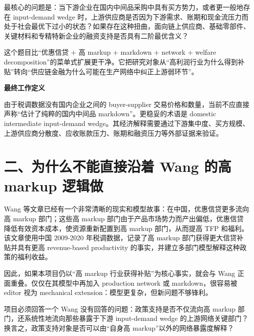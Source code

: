 \documentclass[
  12pt,
]{ctexart}
\begin{document}
最核心的问题是：当下游企业在国内中间品采购中具有买方势力，或者更一般地存在 input-demand wedge 时，上游供应商是否因为下游需求、账期和现金流压力而处于社会最优下过小的状态？如果存在这种扭曲，面向链上供应商、基础零部件、关键材料和专精特新企业的融资支持是否具有二阶最优含义？

这个题目比``优惠信贷 + 高 markup + markdown + network + welfare decomposition''的菜单式扩展更干净。它把研究对象从``高利润行业为什么得到补贴''转向``供应链金融为什么可能在生产网络中纠正上游弱环节''。

\textbf{最终工作定义}

由于税调数据没有国内企业之间的 buyer-supplier 交易价格和数量，当前不应直接声称``估计了纯粹的国内中间品 markdown''。更稳妥的术语是 domestic intermediate input-demand wedge。其经济解释需要通过下游集中度、买方规模、上游供应商分散度、应收账款压力、账期和融资压力等外部证据来验证。

\section{二、为什么不能直接沿着 Wang 的高 markup 逻辑做}\label{ux4e8cux4e3aux4ec0ux4e48ux4e0dux80fdux76f4ux63a5ux6cbfux7740-wang-ux7684ux9ad8-markup-ux903bux8f91ux505a}

Wang 等文章已经有一个非常清晰的现实和模型故事：在中国，优惠信贷更多流向高 markup 部门；这些高 markup 部门由于产品市场势力而产出偏低，优惠信贷降低有效资本成本，使资源重新配置到高 markup 部门，从而提高 TFP 和福利。该文章使用中国 2009-2020 年税调数据，记录了高 markup 部门获得更大信贷补贴并具有更高 revenue-based productivity 的事实，并建立多部门模型解释这种政策的福利收益。

因此，如果本项目仍以``高 markup 行业获得补贴''为核心事实，就会与 Wang 正面重叠。仅仅在其模型中再加入 production network 或 markdown，很容易被 editor 视为 mechanical extension：模型更复杂，但新问题不够锋利。

项目必须回答一个 Wang 没有回答的问题：政策支持是否不仅流向高 markup 部门，还系统性地流向那些暴露于下游 input-demand wedge 的上游网络关键部门？换言之，政策支持对象是否可以由``自身高 markup''以外的网络暴露度解释？
\end{document}
